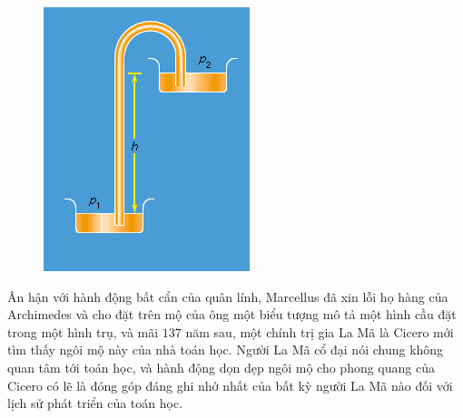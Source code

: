 \begin{multicols}{2}
	\begin{figure}[H]
		\vspace*{-5pt}
		\centering
		\captionsetup{labelformat= empty, justification=centering}
		\includegraphics[width= 1\linewidth]{2}
		\vspace*{-15pt}
	\end{figure}
	Ân hận với hành động bất cẩn của quân lính, Marcellus đã xin lỗi họ hàng của Archimedes và cho đặt trên mộ của ông một biểu tượng mô tả một hình cầu đặt trong một hình trụ, và mãi $137$ năm sau, một chính trị gia La Mã là Cicero mới tìm thấy ngôi mộ này của nhà toán học. Người La Mã cổ đại nói chung không quan tâm tới toán học, và hành động dọn dẹp ngôi mộ cho phong quang của Cicero có lẽ là đóng góp đáng ghi nhớ nhất của bất kỳ người La Mã nào đối với lịch sử phát triển của toán học.
	\begin{figure}[H]
		\vspace*{-5pt}
		\centering
		\captionsetup{labelformat= empty, justification=centering}

\end{figure}
\end{multicols}
